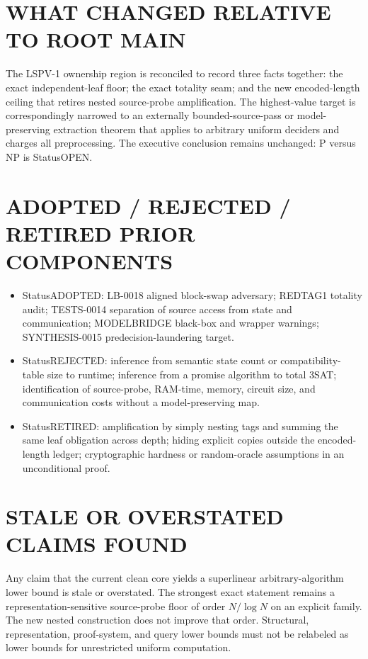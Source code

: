 \documentclass[11pt]{article}
\begin{document}
\section{WHAT CHANGED RELATIVE TO ROOT MAIN}

The LSPV-1 ownership region is reconciled to record three facts together: the exact independent-leaf floor; the exact totality seam; and the new encoded-length ceiling that retires nested source-probe amplification.  The highest-value target is correspondingly narrowed to an externally bounded-source-pass or model-preserving extraction theorem that applies to arbitrary uniform deciders and charges all preprocessing.  The executive conclusion remains unchanged: P versus NP is Status{OPEN}.

\section{ADOPTED / REJECTED / RETIRED PRIOR COMPONENTS}

\begin{itemize}
\item Status{ADOPTED}: LB-0018 aligned block-swap adversary; REDTAG1 totality audit; TESTS-0014 separation of source access from state and communication; MODELBRIDGE black-box and wrapper warnings; SYNTHESIS-0015 predecision-laundering target.
\item Status{REJECTED}: inference from semantic state count or compatibility-table size to runtime; inference from a promise algorithm to total 3SAT; identification of source-probe, RAM-time, memory, circuit size, and communication costs without a model-preserving map.
\item Status{RETIRED}: amplification by simply nesting tags and summing the same leaf obligation across depth; hiding explicit copies outside the encoded-length ledger; cryptographic hardness or random-oracle assumptions in an unconditional proof.
\end{itemize}

\section{STALE OR OVERSTATED CLAIMS FOUND}

Any claim that the current clean core yields a superlinear arbitrary-algorithm lower bound is stale or overstated.  The strongest exact statement remains a representation-sensitive source-probe floor of order $N/\log N$ on an explicit family.  The new nested construction does not improve that order.  Structural, representation, proof-system, and query lower bounds must not be relabeled as lower bounds for unrestricted uniform computation.
\end{document}
